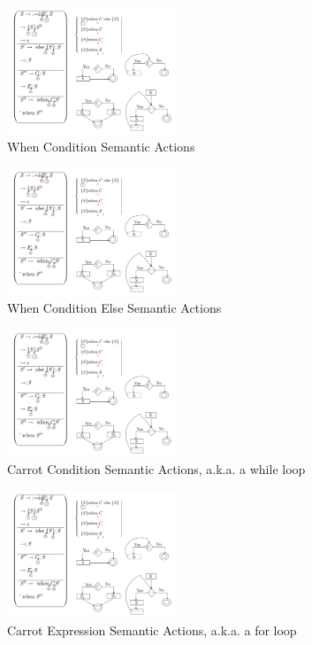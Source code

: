 \documentclass[11pt]{article}
\begin{document}
\begin{figure}[htbp] %
   \centering
   \includegraphics[width=2in]{statementWhenC.pdf} 
   \caption{When Condition Semantic Actions}
   \label{fig:example}
\end{figure}

\begin{figure}[htbp] %
   \centering
   \includegraphics[width=2in]{statementWhenElse.pdf} 
   \caption{When Condition Else Semantic Actions}
   \label{fig:example}
\end{figure}

\begin{figure}[htbp] %
   \centering
   \includegraphics[width=2in]{statementCarrotC.pdf} 
   \caption{Carrot Condition Semantic Actions, a.k.a. a while loop}
   \label{fig:example}
\end{figure}


\begin{figure}[htbp] %
   \centering
   \includegraphics[width=2in]{statementCarrotE.pdf} 
   \caption{Carrot Expression Semantic Actions, a.k.a. a for loop}
   \label{fig:example}
\end{figure}
\end{document}
